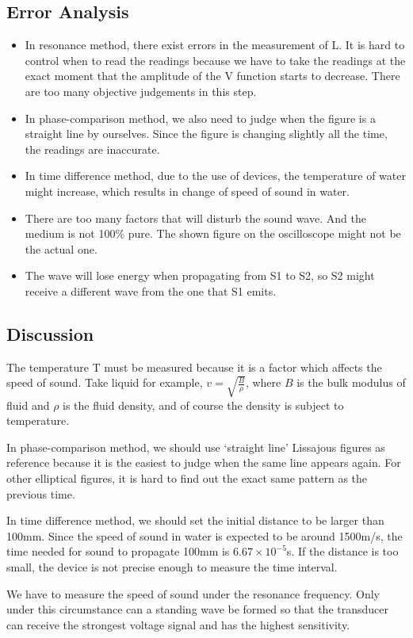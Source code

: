 \documentclass[12pt,a4paper]{article}
\begin{document}
\subsection{Error Analysis}
\begin{itemize}
    \item In resonance method, there exist errors in the measurement of L. It is hard to control when to read the readings because we have to take the readings at the exact moment that the amplitude of the V function starts to decrease. There are too many objective judgements in this step.
    \item In phase-comparison method, we also need to judge when the figure is a straight line by ourselves. Since the figure is changing slightly all the time, the readings are inaccurate.
    \item In time difference method, due to the use of devices, the temperature of water might increase, which results in change of speed of sound in water.
    \item There are too many factors that will disturb the sound wave. And the medium is not 100\% pure. The shown figure on the oscilloscope might not be the actual one.
    \item The wave will lose energy when propagating from S1 to S2, so S2 might receive a different wave from the one that S1 emits.
\end{itemize}	

\subsection{Discussion}
The temperature T must be measured because it is a factor which affects the speed of sound. Take liquid for example, $v=\sqrt{\frac{B}{\rho}}$, where $B$ is the bulk modulus of fluid and $\rho$ is the fluid density, and of course the density is subject to temperature.\par 
In phase-comparison method, we should use ‘straight line’ Lissajous figures as reference because it is the easiest to judge when the same line appears again. For other elliptical figures, it is hard to find out the exact same pattern as the previous time.\par 
In time difference method, we should set the initial distance to be larger than 100mm. Since the speed of sound in water is expected to be around 1500m/s, the time needed for sound to propagate 100mm is $6.67×10^{-5}$s. If the distance is too small, the device is not precise enough to measure the time interval.\par 
We have to measure the speed of sound under the resonance frequency. Only under this circumstance can a standing wave be formed so that the transducer can receive the strongest voltage signal and has the highest sensitivity.
\end{document}
